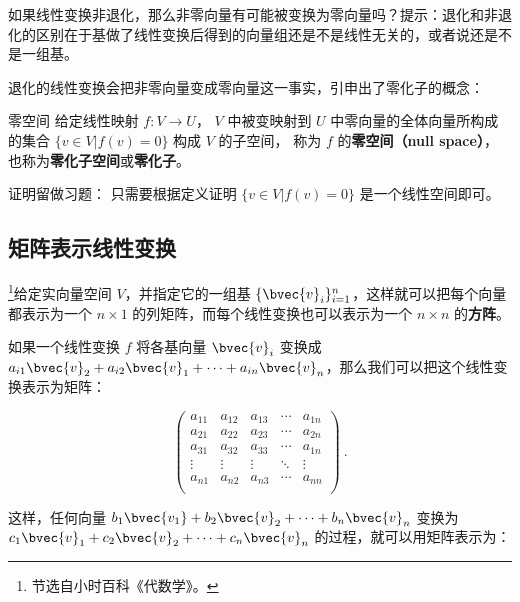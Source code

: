 \begin{exercise}{}
如果线性变换非退化，那么非零向量有可能被变换为零向量吗？提示：退化和非退化的区别在于基做了线性变换后得到的向量组还是不是线性无关的，或者说还是不是一组基。
\end{exercise}

退化的线性变换会把非零向量变成零向量这一事实，引申出了零化子的概念：

\begin{theorem}{零空间}\label{the_LinMap_1}
给定线性映射 $f:V\to U$， $V$ 中被变映射到 $U$ 中零向量的全体向量所构成的集合 $\{v\in V|f(v)= 0\}$ 构成 $V$ 的子空间， 称为 $f$ 的\textbf{零空间（null space）}， 也称为\textbf{零化子空间}或\textbf{零化子}。
\end{theorem}
证明留做习题： 只需要根据定义证明 $\{v\in V|f(v)= 0\}$ 是一个线性空间即可。 

\subsection{矩阵表示线性变换}

\footnote{节选自小时百科《代数学》。}给定实向量空间 $V$，并指定它的一组基 $\{\bvec{v}_i\}_{i=1}^n$，这样就可以把每个向量都表示为一个 $n\times 1$ 的列矩阵，而每个线性变换也可以表示为一个 $n\times n$ 的\textbf{方阵}。

如果一个线性变换 $f$ 将各基向量 $\bvec{v}_i$ 变换成 $a_{i1}\bvec{v}_2+a_{i2}\bvec{v}_1+\cdots+a_{in}\bvec{v}_n$，那么我们可以把这个线性变换表示为矩阵：

\begin{equation}
    \begin{pmatrix}
    a_{11}&a_{12}&a_{13}&\cdots&a_{1n}\\
    a_{21}&a_{22}&a_{23}&\cdots&a_{2n}\\
    a_{31}&a_{32}&a_{33}&\cdots&a_{1n}\\
    \vdots&\vdots&\vdots&\ddots&\vdots\\
    a_{n1}&a_{n2}&a_{n3}&\cdots&a_{nn}\\
    \end{pmatrix}~.
\end{equation}

这样，任何向量 $b_1\bvec{v_1}+b_2\bvec{v}_2+\cdots+b_n\bvec{v}_n$ 变换为 $c_1\bvec{v}_1+c_2\bvec{v}_2+\cdots+c_n\bvec{v}_n$ 的过程，就可以用矩阵表示为：

